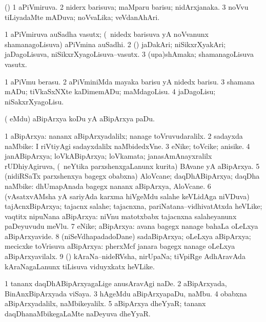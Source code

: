 \bentry
{}
\gl{\gu}
\bmng
(\pArxparx) 
\bnum
\num{1} aPiVmiruva. 
\num{2} niderx barisuva; maMparu barisu; nidArxjanaka. 
\num{3} noVvu tiLiyadaMte mADuva; noVvaLika; veVdanAhAri. 
\enum
\emng
\eentry

\bentry
{}
\gl{\nA}
\bmng
\bnum
\num{1} aPiVmiruva auSadha vasutx; (\sA\ nidedx barisuva yA noVvanunx shamanagoLisuva) aPiVmina auSadhi. 
\num{2} (\rUpa) jaDakAri; niSikxrXyakAri; jaDagoLisuva, niSikxrXyagoLisuva--vasutx. 
\num{3} (upa)shAmaka; shamanagoLisuva vasutx. 
\enum
\emng
\eentry

\bentry
{}
\gl{\sakirx}
\bmng
\bnum
\num{1} aPiVmu berasu. 
\num{2} aPiVminiMda mayaka barisu yA nidedx barisu. 
\num{3} shamana mADu; tiVkaSxNXte kaDimemADu; maMdagoLisu. 
\num{4} jaDagoLisu; niSakxrXyagoLisu. 
\enum
\emng
\eentry

\bentry
{}
\gl{\sakirx}
\bmng
(\eng{$\ldots$} eMdu) aBipArxya koDu yA aBipArxya paDu. 
\emng
\eentry

\bentry
{}
\gl{\nA}
\bmng
\bnum
\num{1} aBipArxya:  nananx aBipArxyadalilx; nanage toVruvudaralilx. 
\num{2} sadayxda naMbike:  I riVtiyAgi sadayxdalilx naMbidedxVne. 
\num{3} eNike; toVcike; anisike. 
\num{4} janABipArxya; loVkABipArxya; loVkamata; janasAmAnayxralilx rUDhiyAgiruva, (\kanmu\ neYtika parxshenxgaLanunx kurita) BAvane yA aBipArxya. 
\num{5} (nidiRSaTx parxshenxya bagegx obabxna) AloVcane; daqDhABipArxya; daqDha naMbike:  dhUmapAnada bagegx nananx aBipArxya, AloVcane. 
\num{6} (vAsatxvAMsha yA sariyAda karxma hiVgeMdu salahe keVLidAga niVDuva) tajAcnxBipArxya; tajacnx salahe; tajacnxna, pariNatana--vidhivatAtxda heVLike; vaqtitx nipuNana aBipArxya:  niVnu matotxbabx tajacnxna salaheyanunx paDeyuvudu meVlu. 
\num{7} eNike; aBipArxya:  avana bagegx nanage bahaLa oLeLxya aBipArxyavide. 
\num{8} (niSeVdhapadadoDane) sadaBipArxya; oLeLxya aBipArxya; mecicxke toVrisuva aBipArxya:  pherxMcf janara bagegx nanage oLeLxya aBipArxyavilalx. 
\num{9} (\nAyxshA) kAraNa--nideRVsha, nirUpaNa; tiVpiRge AdhAravAda kAraNagaLanunx tiLisuva viduyxkatx heVLike. 
\enum
\emng

\noindent
\gl{\pagu}
\bmng
\bnum
\num{1}  tananx daqDhABipArxyagaLige anusAravAgi naDe. 
\num{2}  aBipArxyada, BinAnxBipArxyada viSaya. 
\num{3}  hAgeMdu aBipArxyapaDu, naMbu. 
\num{4}  obabxna aBipArxyadalilx, naMbikeyalilx. 
\num{5}  aBipArxya dheYyaR; tananx daqDhanaMbikegaLaMte naDeyuva dheYyaR. 
\enum
\emng
\eentry

